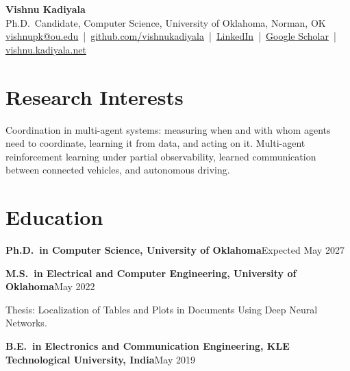 \documentclass[11pt,letterpaper]{article}
\newcommand{\entry}[2]{\textbf{#1}\hfill #2\par}
\begin{document}
\begin{center}
  {\LARGE\bfseries Vishnu Kadiyala}\\[4pt]
  Ph.D.\ Candidate, Computer Science, University of Oklahoma, Norman, OK\\[2pt]
  \href{mailto:vishnupk@ou.edu}{vishnupk@ou.edu} \,|\,
  \href{https://github.com/vishnukadiyala}{github.com/vishnukadiyala} \,|\,
  \href{https://www.linkedin.com/in/vishnu-kadiyala/}{LinkedIn} \,|\,
  \href{https://scholar.google.com/citations?user=3Eh2neYAAAAJ}{Google Scholar} \,|\,
  \href{https://vishnu.kadiyala.net}{vishnu.kadiyala.net}
\end{center}

\section{Research Interests}
Coordination in multi-agent systems: measuring when and with whom agents need to coordinate, learning it from data,
and acting on it. Multi-agent reinforcement learning under partial observability, learned communication between
connected vehicles, and autonomous driving.

\section{Education}
\entry{Ph.D.\ in Computer Science, University of Oklahoma}{Expected May 2027}
\entry{M.S.\ in Electrical and Computer Engineering, University of Oklahoma}{May 2022}
Thesis: Localization of Tables and Plots in Documents Using Deep Neural Networks.\par\smallskip
\entry{B.E.\ in Electronics and Communication Engineering, KLE Technological University, India}{May 2019}
\end{document}
